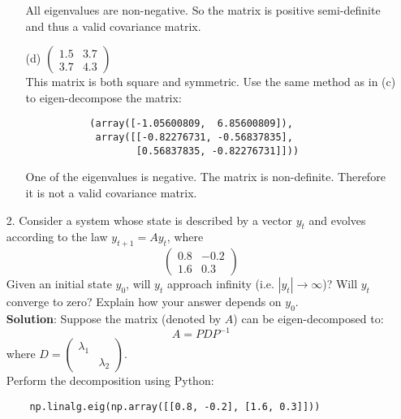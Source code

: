 \documentclass{article}
\begin{document}
\begin{enumerate}
\begin{enumerate}
            All eigenvalues are non-negative. So the matrix is positive semi-definite and thus a valid covariance matrix. \\
            
            \item[(d)] $\begin{pmatrix}1.5 &3.7 \\ 3.7 &4.3 \end{pmatrix}$ \\
            
            This matrix is both square and symmetric. Use the same method as in (c) to eigen-decompose the matrix:
            
            \begin{verbatim}
           (array([-1.05600809,  6.85600809]), 
            array([[-0.82276731, -0.56837835],
                   [0.56837835, -0.82276731]]))
            \end{verbatim}
            
            One of the eigenvalues is negative. The matrix is non-definite. Therefore it is not a valid covariance matrix. \\
            
        \end{enumerate}
    
    
    \item[2. ] Consider a system whose state is described by a vector $y_t$ and evolves according to the law $y_{t+1} = Ay_t$, where
    $$ \begin{pmatrix}0.8 &-0.2 \\ 1.6 &0.3 \end{pmatrix} $$
    Given an initial state $y_0$, will $y_t$ approach infinity (i.e. $|y_t| \rightarrow \infty$)? Will $y_t$ converge to zero? Explain how your answer depends on $y_0$. \\
    
    \textbf{Solution}: Suppose the matrix (denoted by $A$) can be eigen-decomposed to:
    $$ A = PDP^{-1} $$
    where $D=\begin{pmatrix}\lambda_1 & \\ &\lambda_2 \end{pmatrix}$.\\
    
    Perform the decomposition using Python:
    
    \begin{verbatim}
    np.linalg.eig(np.array([[0.8, -0.2], [1.6, 0.3]]))
    \end{verbatim}
    

\end{enumerate}
\end{document}
